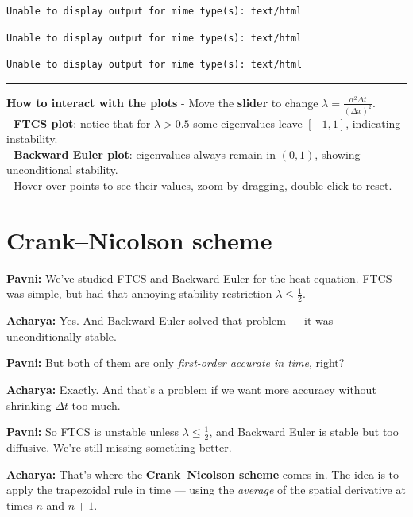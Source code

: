 \documentclass[
  letterpaper,
]{book}
\begin{document}
\begin{verbatim}
Unable to display output for mime type(s): text/html
\end{verbatim}

\begin{verbatim}
Unable to display output for mime type(s): text/html
\end{verbatim}

\begin{verbatim}
Unable to display output for mime type(s): text/html
\end{verbatim}

\begin{center}\rule{0.5\linewidth}{0.5pt}\end{center}

\textbf{How to interact with the plots} - Move the \textbf{slider} to
change \(\lambda = \tfrac{\alpha^2 \Delta t}{(\Delta x)^2}\).\\
- \textbf{FTCS plot}: notice that for \(\lambda > 0.5\) some eigenvalues
leave \([-1,1]\), indicating instability.\\
- \textbf{Backward Euler plot}: eigenvalues always remain in \((0,1)\),
showing unconditional stability.\\
- Hover over points to see their values, zoom by dragging, double-click
to reset.


\chapter{Crank--Nicolson scheme}\label{cranknicolson-scheme}

\textbf{Pavni:} We've studied FTCS and Backward Euler for the heat
equation. FTCS was simple, but had that annoying stability restriction
\(\lambda \leq \tfrac{1}{2}\).

\textbf{Acharya:} Yes. And Backward Euler solved that problem --- it was
unconditionally stable.

\textbf{Pavni:} But both of them are only \emph{first-order accurate in
time}, right?

\textbf{Acharya:} Exactly. And that's a problem if we want more accuracy
without shrinking \(\Delta t\) too much.

\textbf{Pavni:} So FTCS is unstable unless
\(\lambda \leq \tfrac{1}{2}\), and Backward Euler is stable but too
diffusive. We're still missing something better.

\textbf{Acharya:} That's where the \textbf{Crank--Nicolson scheme} comes
in. The idea is to apply the trapezoidal rule in time --- using the
\emph{average} of the spatial derivative at times \(n\) and \(n+1\).
\end{document}
